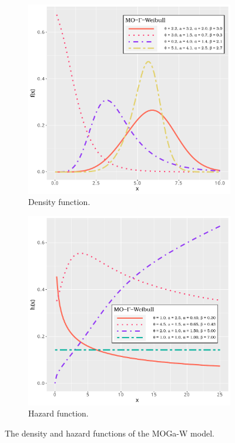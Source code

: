 \documentclass[twoside,leqno,11pt]{article}
\begin{document}
\begin{figure}[H]
	\centering
	\begin{subfigure}[b]{0.49\textwidth}
		\centering
		\includegraphics[width=\textwidth]{pdf_function.pdf}
		\caption{Density function.}
		\label{fig:pdf}
	\end{subfigure}
	\hfill
	\begin{subfigure}[b]{0.49\textwidth}
		\centering
		\includegraphics[width=\textwidth]{hazard_function.pdf}
		\caption{Hazard function.}
		\label{fig:hazard}
	\end{subfigure}
\caption{The density and hazard functions of the MOGa-W model.}
\label{formas}
\end{figure}
\end{document}
